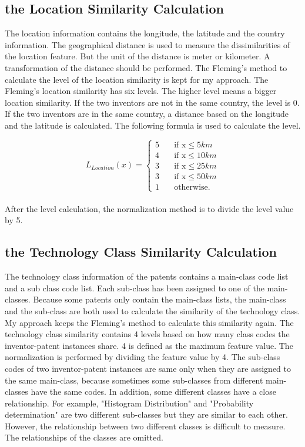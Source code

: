 \subsection{the Location Similarity Calculation}
The location information contains the longitude, the latitude and the country information. The geographical distance is used to measure the dissimilarities of the location feature. But the unit of the distance is meter or kilometer. A transformation of the distance should be performed. The Fleming's method \cite{RePEc:eee:respol:v:43:y:2014:i:6:p:941-955} to calculate the level of the location similarity is kept for my approach. The Fleming's location similarity has six levels. The higher level means a bigger location similarity. If the two inventors are not in the same country, the level is 0. If the two inventors are in the same country, a distance based on the longitude and the latitude is calculated. The following formula is used to calculate the level.

\[   
L_{Location}(x) = 
     \begin{cases}
       \text{5} &\quad\text{if x}\le5km\\
       \text{4} &\quad\text{if x}\le10km \\
       \text{3} &\quad\text{if x}\le25km\\
       \text{3} &\quad\text{if x}\le50km\\
       \text{1} &\quad\text{otherwise.} \ 
     \end{cases}
\]
\\

After the level calculation, the normalization method is to divide the level value by 5.

\subsection{the Technology Class Similarity Calculation}
The technology class information of the patents contains a main-class code list and a sub class code list. Each sub-class has been assigned to one of the main-classes. Because some patents only contain the main-class lists, the main-class and the sub-class are both used to calculate the similarity of the technology class. My approach keeps the Fleming's method to calculate this similarity again. The technology class similarity contains 4 levels based on how many class codes the inventor-patent instances share. 4 is defined as the maximum feature value. The normalization is performed by dividing the feature value by 4. The sub-class codes of two inventor-patent instances are same only when they are assigned to the same main-class, because sometimes some sub-classes from different main-classes have the same codes. In addition, some different classes have a close relationship. For example, "Histogram Distribution" and "Probability determination" are two different sub-classes but they are similar to each other. However, the relationship between two different classes is difficult to measure. The relationships of the classes are omitted.


